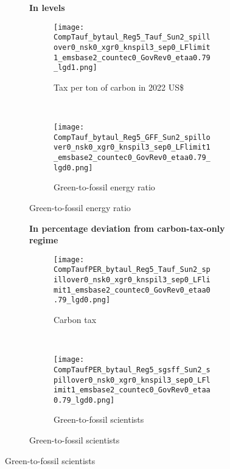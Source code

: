 \begin{figure}[h!!]
	\centering
	\caption{Meeting the emission limit with and without preexisting labor tax }\label{fig:Limit_nsk0_xgr0_know}
	\begin{subfigure}[]{1\textwidth}
		\centering\footnotesize{\textbf{In levels}}\\ \vspace{2mm}
		\begin{subfigure}[]{0.4\textwidth}
			\caption{Tax per ton of carbon in 2022 US\$}
			\texttt{[image: CompTauf\_bytaul\_Reg5\_Tauf\_Sun2\_spillover0\_nsk0\_xgr0\_knspil3\_sep0\_LFlimit1\_emsbase2\_countec0\_GovRev0\_etaa0.79\_lgd1.png]}
		\end{subfigure}	
		\begin{minipage}[]{0.1\textwidth}
			\
		\end{minipage}
		\begin{subfigure}[]{0.4\textwidth}
			\caption{Green-to-fossil energy ratio}
			\texttt{[image: CompTauf\_bytaul\_Reg5\_GFF\_Sun2\_spillover0\_nsk0\_xgr0\_knspil3\_sep0\_LFlimit1\_emsbase2\_countec0\_GovRev0\_etaa0.79\_lgd0.png]}
		\end{subfigure}	 
	\end{subfigure}		
	
	\vspace{3mm}
	\begin{subfigure}[]{1\textwidth}
		\centering\footnotesize{\textbf{In percentage deviation from carbon-tax-only regime}}\\ \vspace{2mm}
		\begin{subfigure}[]{0.4\textwidth}
			\caption{Carbon tax}
			\texttt{[image: CompTaufPER\_bytaul\_Reg5\_Tauf\_Sun2\_spillover0\_nsk0\_xgr0\_knspil3\_sep0\_LFlimit1\_emsbase2\_countec0\_GovRev0\_etaa0.79\_lgd0.png]} 
		\end{subfigure}
		\begin{minipage}[]{0.1\textwidth}
			\
		\end{minipage}
		\begin{subfigure}[]{0.4\textwidth}
			\caption{Green-to-fossil scientists}
			\texttt{[image: CompTaufPER\_bytaul\_Reg5\_sgsff\_Sun2\_spillover0\_nsk0\_xgr0\_knspil3\_sep0\_LFlimit1\_emsbase2\_countec0\_GovRev0\_etaa0.79\_lgd0.png]} 
		\end{subfigure}		
	\end{subfigure}			
\end{figure} 

